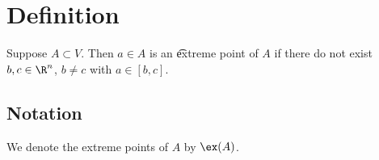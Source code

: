 

\section*{Definition}

Suppose $A \subset V$.
Then $a \in A$ is an \t{extreme point} of $A$ if there do not exist $b, c \in \R ^n$, $b \neq c$ with $a \in [b, c]$.


\subsection*{Notation}

We denote the extreme points of $A$ by $\ex(A)$.

\blankpage